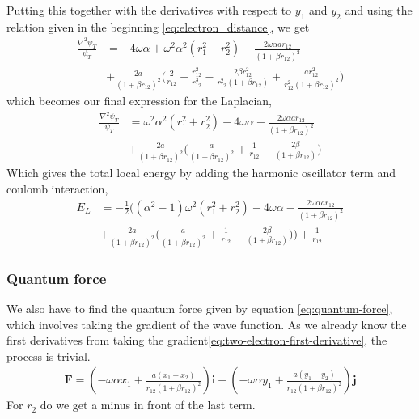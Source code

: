 \documentclass[11pt]{article}
\begin{document}
Putting this together with the derivatives with respect to $y_1$ and $y_2$ and using the relation given in the beginning \eqref{eq:electron_distance}, we get
\begin{align*}
	\frac{\nabla^2 \psi_T}{\psi_T} &= - 4\omega \alpha + \omega^2 \alpha ^2(r_1^2 + r_2^2) - \frac{2\omega\alpha a r_{12}}{(1+\beta r_{12})^2} \\
	&+ \frac{2a}{(1+\beta r_{12})^2}\bigg( \frac{2}{r_{12}} - \frac{r_{12}^2}{r_{12}^3} - \frac{2\beta r_{12}^2}{r_{12}^2(1+ \beta r_{12})} + \frac{a r_{12}^2}{r_{12}^2(1+\beta r_{12})^2}\bigg)
\end{align*}
which becomes our final expression for the Laplacian,
\begin{align}
	\frac{\nabla^2 \psi_T}{\psi_T} &= \omega^2 \alpha ^2(r_1^2 + r_2^2) - 4\omega \alpha - \frac{2\omega\alpha a r_{12}}{(1+\beta r_{12})^2} \\
	&+ \frac{2a}{(1+\beta r_{12})^2}\bigg(\frac{a }{(1+\beta r_{12})^2} + \frac{1}{r_{12}} - \frac{2\beta}{(1+ \beta r_{12})} \bigg)
	\label{eq:two-electron-laplacian}
\end{align}
Which gives the total local energy by adding the harmonic oscillator term and coulomb interaction,
\begin{align}
	E_L &= -\frac{1}{2}\bigg((\alpha ^2-1)\omega^2(r_1^2 + r_2^2) - 4\omega \alpha - \frac{2\omega\alpha a r_{12}}{(1+\beta r_{12})^2} \\
	&+ \frac{2a}{(1+\beta r_{12})^2}\bigg(\frac{a }{(1+\beta r_{12})^2} + \frac{1}{r_{12}} - \frac{2\beta}{(1+ \beta r_{12})} \bigg)\bigg) + \frac{1}{r_{12}}
	\label{eq:two-electron-local-energy}
\end{align}

\subsubsection{Quantum force}
We also have to find the quantum force given by equation \eqref{eq:quantum-force}, which involves taking the gradient of the wave function. As we already know the first derivatives from taking the gradient\eqref{eq:two-electron-first-derivative}, the process is trivial.
\begin{align*}
	\mathbf{F} = \left(-\omega\alpha x_1 + \frac{a(x_1-x_2)}{r_{12}(1+\beta r_{12})^2} \right)\mathbf{i} + \left(-\omega\alpha y_1 + \frac{a(y_1-y_2)}{r_{12}(1+\beta r_{12})^2} \right)\mathbf{j}
\end{align*}
For $r_2$ do we get a minus in front of the last term.
\end{document}
